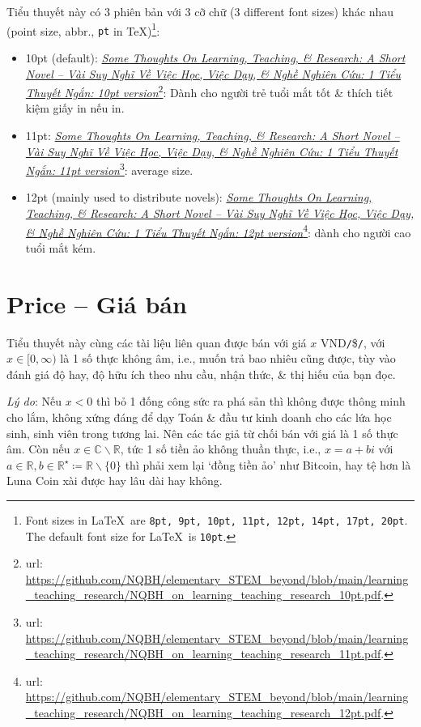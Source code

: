 \documentclass[12pt,oneside]{book}
\begin{document}
Tiểu thuyết này có 3 phiên bản với 3 cỡ chữ (3 different font sizes) khác nhau (point size, abbr., {\tt pt} in \TeX)\footnote{Font sizes in \LaTeX\ are {\tt8pt, 9pt, 10pt, 11pt, 12pt, 14pt, 17pt, 20pt}. The default font size for \LaTeX\ is {\tt10pt}.}:
\begin{itemize}
	\item 10pt (default): \href{https://github.com/NQBH/elementary_STEM_beyond/blob/main/learning_teaching_research/NQBH_on_learning_teaching_research_10pt.pdf}{\it Some Thoughts On Learning, Teaching, \& Research: A Short Novel -- Vài Suy Nghĩ Về Việc Học, Việc Dạy, \& Nghề Nghiên Cứu: 1 Tiểu Thuyết Ngắn: 10pt version}\footnote{{\sc url}: \url{https://github.com/NQBH/elementary_STEM_beyond/blob/main/learning_teaching_research/NQBH_on_learning_teaching_research_10pt.pdf}.}: Dành cho người trẻ tuổi mắt tốt \& thích tiết kiệm giấy in nếu in.
	\item 11pt: \href{https://github.com/NQBH/elementary_STEM_beyond/blob/main/learning_teaching_research/NQBH_on_learning_teaching_research_11pt.pdf}{\it Some Thoughts On Learning, Teaching, \& Research: A Short Novel -- Vài Suy Nghĩ Về Việc Học, Việc Dạy, \& Nghề Nghiên Cứu: 1 Tiểu Thuyết Ngắn: 11pt version}\footnote{{\sc url}: \url{https://github.com/NQBH/elementary_STEM_beyond/blob/main/learning_teaching_research/NQBH_on_learning_teaching_research_11pt.pdf}.}: average size.
	\item 12pt (mainly used to distribute novels): \href{https://github.com/NQBH/elementary_STEM_beyond/blob/main/learning_teaching_research/NQBH_on_learning_teaching_research_12pt.pdf}{\it Some Thoughts On Learning, Teaching, \& Research: A Short Novel -- Vài Suy Nghĩ Về Việc Học, Việc Dạy, \& Nghề Nghiên Cứu: 1 Tiểu Thuyết Ngắn: 12pt version}\footnote{{\sc url}: \url{https://github.com/NQBH/elementary_STEM_beyond/blob/main/learning_teaching_research/NQBH_on_learning_teaching_research_12pt.pdf}.}: dành cho người cao tuổi mắt kém.
\end{itemize}

\section{Price -- Giá bán}
Tiểu thuyết này cùng các tài liệu liên quan được bán với giá $x$ VND{\tt/}\${\tt/}\texteuro, với $x\in[0,\infty)$ là 1 số thực không âm, i.e., muốn trả bao nhiêu cũng được, tùy vào đánh giá độ hay, độ hữu ích theo nhu cầu, nhận thức, \& thị hiếu của bạn đọc.

{\it Lý do}: Nếu $x < 0$ thì bỏ 1 đống công sức ra phá sản thì không được thông minh cho lắm, không xứng đáng để dạy Toán \& đầu tư kinh doanh cho các lứa học sinh, sinh viên trong tương lai. Nên các tác giả từ chối bán với giá là 1 số thực âm. Còn nếu $x\in\mathbb{C}\backslash\mathbb{R}$, tức 1 số tiền ảo không thuần thực, i.e., $x = a + bi$ với $a\in\mathbb{R},b\in\mathbb{R}^\star\coloneqq\mathbb{R}\backslash\{0\}$ thì phải xem lại `đồng tiền ảo' như Bitcoin, hay tệ hơn là Luna Coin xài được hay lâu dài hay không.
\end{document}
